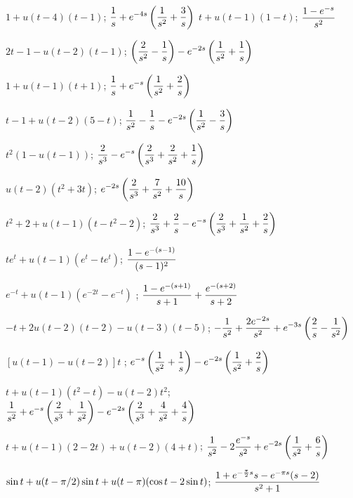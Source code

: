 \medskip

 $ 1+u(t-4)(t-1)$;\;   $\displaystyle{\frac{1}{s}+e^{-4s}\left(\frac{1}{s^{2}}+\frac{3}{s}\right)}$
  $t+u(t-1)(1-t)$;\;
$\displaystyle\frac{1-e^{-s}}{s^{2}}$

 $2t-1-u(t-2)(t-1)$;\;   $\displaystyle{\left(\frac{2}{s^{2}}-\frac{1}{s}\right)-e^{-2s}\left(\frac{1}{s^{2}}+\frac{1}{s}\right)}$

 $1+u(t-1)(t+1)$;\;   $\displaystyle{\frac{1}{s}
+e^{-s}\left(\frac{1}{s^{2}}+\frac{2}{s}\right)}$

 $t-1+u(t-2)(5-t)$;\;   $\displaystyle{\frac{1}{s^{2}}-\frac{1}{s}-e^{-2s}\left(\frac{1}{s^{2}}-\frac{3}{s}\right)}$

  $t^{2}\left(1-u(t-1)\right)$;\;
$\displaystyle{
\frac{2}{s^{3}}-e^{-s}\left(\frac{2}{s^{3}}+\frac{2}{s^{2}}+\frac{1}{s}\right)}$

 $u(t-2)(t^{2}+3t)$;\;   $\displaystyle{
e^{-2s}\left(\frac{2}{s^{3}}+\frac{7}{s^{2}}+\frac{10}{s}\right)}$

 $t^{2}+2+u(t-1)(t-t^{2}-2)$;\;   $\displaystyle{\frac{2}{s^{3}}+\frac{2}{s}-e^{-s}\left(\frac{2}{s^{3}}+\frac{1}{s^{2}}+\frac{2}{s}\right)}$

 $te^{t}+u(t-1)(e^{t}-te^{t})$;\;
$\displaystyle\frac{1-e^{-(s-1)}}{(s-1)^{2}}$

 $e^{-t}+u(t-1)(e^{-2t}-e^{-t})$ ;\;
$\displaystyle{\frac{1-e^{-(s+1)}}{s+1}+\frac{e^{-(s+2)}}{s+2}}$

 $-t+2u(t-2)(t-2)-u(t-3)(t-5)$;\;
$\displaystyle{-\frac{1}{s^{2}}+\frac{2e^{-2s}}{s^{2}}+e^{-3s}\left(\frac{2}{s}-\frac{1}{s^{2}}\right)}$

 $\left[u(t-1)-u(t-2)\right]t$ ;\;   $\displaystyle{
e^{-s}\left(\frac{1}{s^{2}}+\frac{1}{s}\right)-e^{-2s}\left(\frac{1}{s^{2}}
+\frac{2}{s}\right)}$

 $t+u(t-1)(t^{2}-t)-u(t-2)t^{2}$;\;
$\displaystyle{\frac{1}{s^{2}}+e^{-s}\left(\frac{2}{s^{3}}+\frac{1}{s^{2}}\right)
-e^{-2s}\left(\frac{2}{s^{3}}+\frac{4}{s^{2}}+\frac{4}{s}\right)}$

 $t+u(t-1)(2-2t)+u(t-2)(4+t)$;\;
$\displaystyle{\frac{1}{s^{2}}-2{\frac{e^{-s}}{s^{2}}}+e^{-2s}\left(\frac{1}{s^{2}}+\frac{6}{s}\right)}$

 $\displaystyle{\sin t+u(t-\pi/2)\sin t+u(t-\pi)(\cos
t-2\sin t)}$;\;   $\displaystyle{\frac{1+e^{-\frac{\pi}{2}s}s-e^{-\pi s}(s-2)}{s^{2}+1}}$


